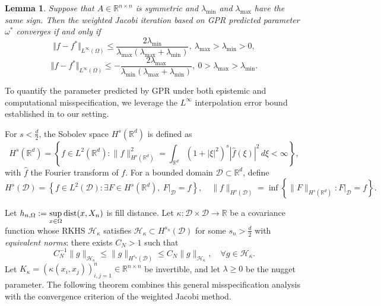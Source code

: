\documentclass[preprint,review,sort&compress,3p]{elsarticle}
\newtheorem{lem}{Lemma }[section]
\begin{document}
\begin{lem}
	\label{GPR_Jacobi_convergence2}
	Suppose that $A\in \mathbb{R}^{n\times n}$ is symmetric and $\lambda_{\min}$ and $\lambda_{\max}$ have the same sign. Then the weighted Jacobi iteration based on GPR predicted parameter $\omega^*$ converges if and only if 
	\begin{equation}
		\label{convergence_2_1}
		\Vert f-f^*\Vert_{L^\infty(\Omega)} \le \frac{2\lambda_{\min}}{\lambda_{\max}(\lambda_{\max}+\lambda_{\min})}, ~ \lambda_{\max}>\lambda_{\min}>0,
	\end{equation}
	\begin{equation}
		\label{convergence_2_2}
		\Vert f-f^*\Vert_{L^\infty(\Omega)} \le -\frac{2\lambda_{\max}}{\lambda_{\min}(\lambda_{\max}+\lambda_{\min})}, ~ 0>\lambda_{\max}>\lambda_{\min}.
	\end{equation}
\end{lem}

To quantify the parameter predicted by GPR under both epistemic and computational misspecification, we leverage the $L^\infty$ interpolation error bound established in \cite{D-R-2025} to our setting. 




For $s < \frac{d}{2}$, the Sobolev space $H^s(\mathbb{R}^d)$ is defined as
\[
H^s(\mathbb{R}^d) = \left\{ f \in L^2(\mathbb{R}^d) : \|f\|_{H^s(\mathbb{R}^d)}^2 = \int_{\mathbb{R}^d} (1 + |\xi|^2)^s |\hat{f}(\xi)|^2 \, d\xi < \infty \right\},
\]
with $\hat{f}$ the Fourier transform of $f$. For a bounded domain $\mathcal{D} \subset \mathbb{R}^d$, define
\[
H^s(\mathcal{D}) = \left\{ f \in L^2(\mathcal{D}) : \exists F \in H^s(\mathbb{R}^d),\ F|_{\mathcal{D}} = f \right\}, \quad
\|f\|_{H^s(\mathcal{D})} = \inf \left\{ \|F\|_{H^s(\mathbb{R}^d)} : F|_{\mathcal{D}} = f \right\}.
\]



Let $h_{n,\Omega}:= \sup\limits_{x\in\Omega}{\rm{dist}}(x,X_n)$ is fill distance.
Let $\kappa: \mathcal{D} \times \mathcal{D} \to \mathbb{R}$ be a covariance function whose RKHS $\mathcal{H}_\kappa$ satisfies $\mathcal{H}_\kappa \subset H^{s_n}(\mathcal{D})$ for some $s_n > \frac{d}{2}$ with \emph{equivalent norms}: there exists $C_N > 1$ such that
\[
C_N^{-1} \|g\|_{\mathcal{H}_\kappa} \leq \|g\|_{H^{s_n}(\mathcal{D})} \leq C_N \|g\|_{\mathcal{H}_\kappa}, \quad \forall g \in \mathcal{H}_\kappa.
\]
Let $K_\kappa = (\kappa(x_i, x_j))_{i,j=1}^n \in \mathbb{R}^{n \times n}$ be invertible, and let $\lambda \geq 0$ be the nugget parameter.
The following theorem combines this general misspecification analysis with the convergence criterion of the weighted Jacobi method.
\end{document}
